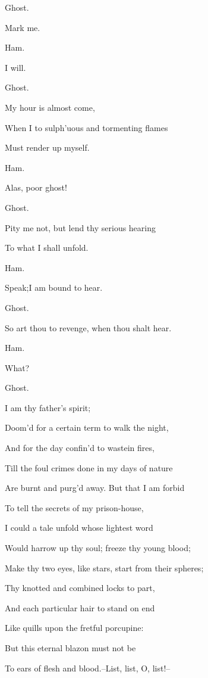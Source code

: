 \documentclass[12pt]{book}
\begin{document}
Ghost.

Mark me.



Ham.

I will.



Ghost.

My hour is almost come,

When I to sulph'uous and tormenting flames

Must render up myself.



Ham.

Alas, poor ghost!



Ghost.

Pity me not, but lend thy serious hearing

To what I shall unfold.



Ham.

Speak;I am bound to hear.



Ghost.

So art thou to revenge, when thou shalt hear.



Ham.

What?



Ghost.

I am thy father's spirit;

Doom'd for a certain term to walk the night,

And for the day confin'd to wastein fires,

Till the foul crimes done in my days of nature

Are burnt and purg'd away. But that I am forbid

To tell the secrets of my prison-house,

I could a tale unfold whose lightest word

Would harrow up thy soul; freeze thy young blood;

Make thy two eyes, like stars, start from their spheres;

Thy knotted and combined locks to part,

And each particular hair to stand on end

Like quills upon the fretful porcupine:

But this eternal blazon must not be

To ears of flesh and blood.--List, list, O, list!--
\end{document}
